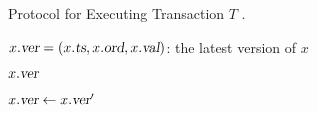 \setcounter{algorithm}{0}
\begin{algorithm}[H]
  \caption{\rvsims{} Protocol for Executing Transaction $T$ .}
  \begin{algorithmic}[1]
    \Statex $x.\textsl{ver} = (x.\textsl{ts}, x.\textsl{ord}, x.\textsl{val})$: the latest version of $x$
    \hStatex

    \State \Return $x.\textsl{ver}$
    \EndProcedure

    \algrenewcommand{}
     \label{line:received}
      \State $x.\textsl{ver} \gets x.\textsl{ver}'$
      \EndIf
    \EndFor
    \EndProcedure
  \end{algorithmic}
\end{algorithm}
